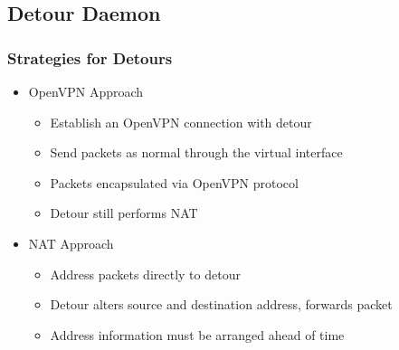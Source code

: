 \documentclass{beamer}
\begin{document}
\subsection{Detour Daemon}

\begin{frame}
  \frametitle{Strategies for Detours}

  \begin{itemize}
  \item OpenVPN Approach
    \begin{itemize}
    \item Establish an OpenVPN connection with detour
    \item Send packets as normal through the virtual interface
    \item Packets encapsulated via OpenVPN protocol
    \item Detour still performs NAT
    \end{itemize}
  \item NAT Approach
    \begin{itemize}
    \item Address packets directly to detour
    \item Detour alters source and destination address, forwards packet
    \item Address information must be arranged ahead of time
    \end{itemize}
  \end{itemize}
\end{frame}
\end{document}
